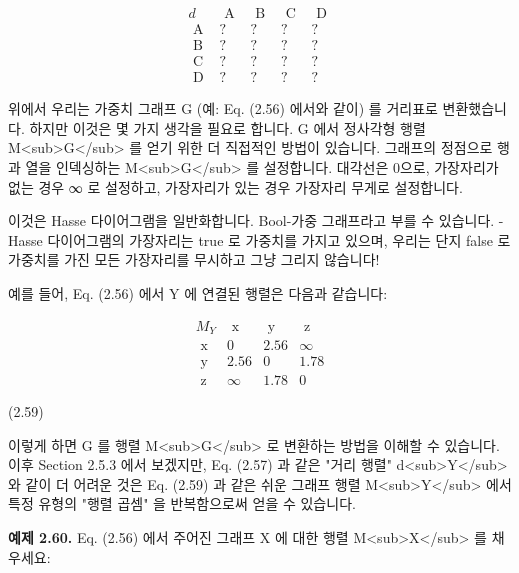 \documentclass[11pt, a4paper, twoside, openany]{book}
\begin{document}
{\par\medskip
$$
\begin{array}{c|cccc}
d & \text { A } & \text { B } & \text { C } & \text { D } \\
\hline
\text { A } & ? & ? & ? & ? \\
\text { B } & ? & ? & ? & ? \\
\text { C } & ? & ? & ? & ? \\
\text { D } & ? & ? & ? & ?
\end{array}
$$

\par\medskip
위에서 우리는 가중치 그래프 G (예: Eq. (2.56) 에서와 같이) 를 거리표로 변환했습니다. 하지만 이것은 몇 가지 생각을 필요로 합니다. G 에서 정사각형 행렬 M<sub>G</sub> 를 얻기 위한 더 직접적인 방법이 있습니다. 그래프의 정점으로 행과 열을 인덱싱하는 M<sub>G</sub> 를 설정합니다. 대각선은 0\hspace{0pt}으로, 가장자리가 없는 경우 ∞ 로 설정하고, 가장자리가 있는 경우 가장자리 무게로 설정합니다.

\par{} 이것은 Hasse 다이어그램을 일반화합니다. Bool-가중 그래프라고 부를 수 있습니다. -Hasse 다이어그램의 가장자리는 true 로 가중치를 가지고 있으며, 우리는 단지 false 로 가중치를 가진 모든 가장자리를 무시하고 그냥 그리지 않습니다!

\par\medskip
예를 들어, Eq. (2.56) 에서 Y 에 연결된 행렬은 다음과 같습니다:

\par\medskip
$$
\begin{array}{c|ccc}
M_{Y} & \text { x } & \text { y } & \text { z } \\
\hline
\text { x } & 0 & 2.56 & \infty \\
\text { y } & 2.56 & 0 & 1.78 \\
\text { z } & \infty & 1.78 & 0
\end{array}
$$

\par\medskip
(2.59)

\par\medskip
이렇게 하면 G 를 행렬 M<sub>G</sub> 로 변환하는 방법을 이해할 수 있습니다. 이후 Section 2.5.3 에서 보겠지만, Eq. (2.57) 과 같은 "거리 행렬" d<sub>Y</sub> 와 같이 더 어려운 것은 Eq. (2.59) 과 같은 쉬운 그래프 행렬 M<sub>Y</sub> 에서 특정 유형의 "행렬 곱셈" 을 반복함으로써 얻을 수 있습니다.

\par\medskip
\textbf{예제 2.60.}  Eq. (2.56) 에서 주어진 그래프 X 에 대한 행렬 M<sub>X</sub> 를 채우세요:

}
\end{document}
